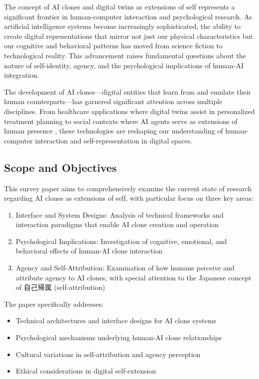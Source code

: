 The concept of AI clones and digital twins as extensions of self represents a significant frontier in human-computer interaction and psychological research. As artificial intelligence systems become increasingly sophisticated, the ability to create digital representations that mirror not just our physical characteristics but our cognitive and behavioral patterns has moved from science fiction to technological reality. This advancement raises fundamental questions about the nature of self-identity, agency, and the psychological implications of human-AI integration.

The development of AI clones---digital entities that learn from and emulate their human counterparts---has garnered significant attention across multiple disciplines. From healthcare applications where digital twins assist in personalized treatment planning \citep{kim2024healthcare} to social contexts where AI agents serve as extensions of human presence \citep{kawakami2020digital}, these technologies are reshaping our understanding of human-computer interaction and self-representation in digital spaces.

\subsection{Scope and Objectives}

This survey paper aims to comprehensively examine the current state of research regarding AI clones as extensions of self, with particular focus on three key areas:

\begin{enumerate}
\item Interface and System Designs: Analysis of technical frameworks and interaction paradigms that enable AI clone creation and operation
\item Psychological Implications: Investigation of cognitive, emotional, and behavioral effects of human-AI clone interaction
\item Agency and Self-Attribution: Examination of how humans perceive and attribute agency to AI clones, with special attention to the Japanese concept of 自己帰属 (self-attribution)
\end{enumerate}

The paper specifically addresses:
\begin{itemize}
\item Technical architectures and interface designs for AI clone systems
\item Psychological mechanisms underlying human-AI clone relationships
\item Cultural variations in self-attribution and agency perception
\item Ethical considerations in digital self-extension
\end{itemize}

